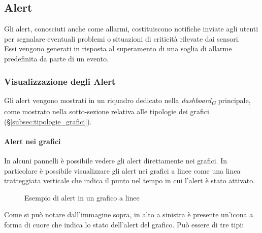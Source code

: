 \subsection{Alert}
Gli alert, conosciuti anche come allarmi, costituiscono notifiche inviate agli utenti per segnalare eventuali problemi o situazioni di criticità rilevate dai sensori.\\
Essi vengono generati in risposta al superamento di una soglia di allarme predefinita da parte di un evento. \\

\subsubsection{Visualizzazione degli Alert}
Gli alert vengono mostrati in un riquadro dedicato nella \textit{dashboard}\textsubscript{\textit{G}} principale, come mostrato nella sotto-sezione relativa alle tipologie dei grafici (\S\ref{subsec:tipologie_grafici}). \\

\paragraph{Alert nei grafici}
In alcuni pannelli è possibile vedere gli alert direttamente nei grafici. In particolare è possibile visualizzare gli alert nei grafici a linee come una linea tratteggiata verticale che indica il punto nel tempo in cui l'alert è stato attivato. \\
\begin{figure}[H]
    \centering
    \caption{Esempio di alert in un grafico a linee}
    \label{fig:my_label}
\end{figure}
Come si può notare dall'immagine sopra, in alto a sinistra è presente un'icona a forma di cuore che indica lo stato dell'alert del grafico. Può essere di tre tipi: 

